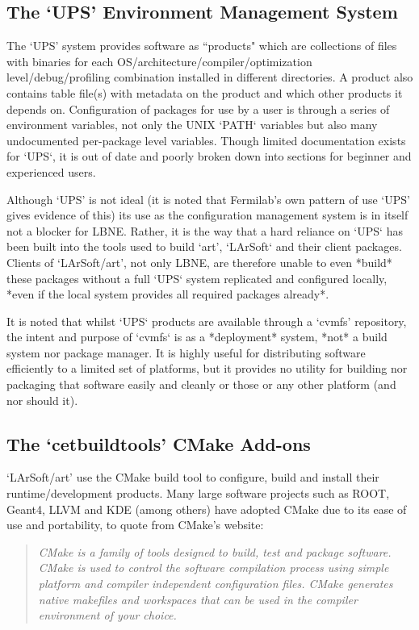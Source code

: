 \documentclass[usletter]{article}
\begin{document}
\subsection{The `UPS' Environment Management System}

The `UPS' system provides software as ``products" which are
 collections of files with binaries for each
OS/architecture/compiler/optimization level/debug/profiling combination installed
in different directories. A product also contains table file(s)
with metadata on the product and which other products it depends on.
Configuration of packages for use by a user is through a series of
environment variables, not only the UNIX `PATH` variables but also many
undocumented per-package level variables. Though limited documentation
exists for `UPS`, it is out of date and poorly broken down into sections
for beginner and experienced users.

Although `UPS' is not ideal (it is noted that Fermilab's own pattern of use
`UPS' gives evidence of this) its use as the configuration management system
is in itself not a blocker for LBNE. Rather, it is the way that a hard
reliance on `UPS` has been built into the tools used to build `art',
`LArSoft` and their client packages. Clients of `LArSoft/art', not only
LBNE, are therefore unable to even *build* these packages without a full
`UPS` system replicated and configured locally, *even if the local system
provides all required packages already*.

It is noted that whilst `UPS` products are available through a `cvmfs'
repository, the intent and purpose of `cvmfs` is as a *deployment* system,
*not* a build system nor package manager. It is highly
useful for distributing software efficiently to a limited set of platforms,
but it provides no utility for building nor packaging that software easily
and cleanly or those or any other platform (and nor should it).

\subsection{The `cetbuildtools' CMake Add-ons}

`LArSoft/art' use the CMake build tool to configure, build and install
their runtime/development products. Many large software projects such as
ROOT, Geant4, LLVM and KDE (among others) have adopted CMake due to its
ease of use and portability, to quote from CMake's website:

\begin{quote}
\textit{CMake is a family of tools designed to build, test and package software.
 CMake is used to control the software compilation process using simple
 platform and compiler independent configuration files. CMake generates
 native makefiles and workspaces that can be used in the compiler
 environment of your choice.}
\end{quote}
\end{document}
